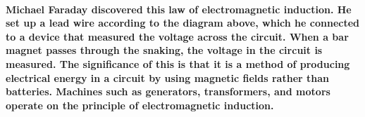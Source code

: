 \documentclass{report}
\begin{document}
\paragraph{Michael Faraday discovered this law of electromagnetic induction. He set up a lead wire according to the diagram above, which he connected to a device that measured the voltage across the circuit. When a bar magnet passes through the snaking, the voltage in the circuit is measured. The significance of this is that it is a method of producing electrical energy in a circuit by using magnetic fields rather than batteries. Machines such as generators, transformers, and motors operate on the principle of electromagnetic induction.~\cite{hcverma1992conceptsofphysics}}



\end{document}

